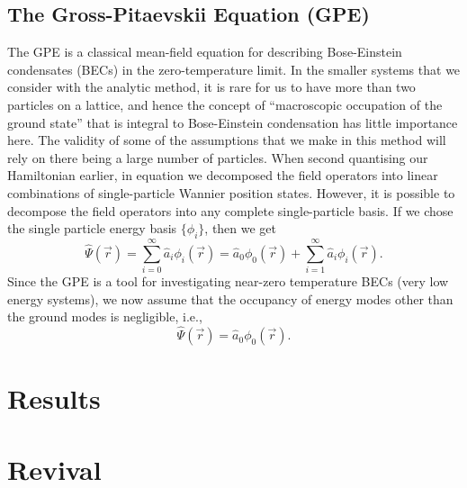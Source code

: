 \documentclass[a4paper,10pt]{article}
\theoremstyle{plain}
\begin{document}
\subsection{The Gross-Pitaevskii Equation (GPE)}
The GPE is a classical mean-field equation for describing Bose-Einstein condensates (BECs) in the zero-temperature limit. In the smaller systems that we consider with the analytic method, it is rare
for us to have more than two particles on a lattice, and hence the concept of ``macroscopic occupation of the ground state'' that is integral to Bose-Einstein condensation has little importance here.
The validity of some of the assumptions that we make in this method will rely on there being a large number of particles. 
When second quantising our Hamiltonian earlier, in equation \label{field_operators_wannier} we decomposed the field operators into linear combinations of single-particle Wannier position states.
However, it is possible to decompose the field operators into any complete single-particle basis. If we chose the single particle energy basis $\{\phi_i\}$, then we get
\begin{equation}
 \hat{\Psi}(\vec{r})=\sum_{i=0}^\infty \hat{a}_i\phi_{i}(\vec{r}) = \hat{a}_0\phi_{0}(\vec{r}) + \sum_{i=1}^\infty \hat{a}_i\phi_{i}(\vec{r}).
\end{equation}
Since the GPE is a tool for investigating near-zero temperature BECs (very low energy systems), we now assume that the occupancy of energy modes other than the ground modes is negligible, i.e.,
\begin{equation}
 \hat{\Psi}(\vec{r})=\hat{a}_0\phi_{0}(\vec{r}).
\end{equation}



\section{Results}

\section{Revival \label{revival}}
\end{document}
